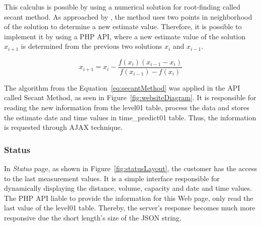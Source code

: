 This calculus is possible by using a numerical solution for root-finding called secant method. As approached by \cite{GIFLAT:2013}, the method uses two points in neighborhood of the solution to determine a new estimate value. Therefore, it is possible to implement it by using a \gls{PHP} \gls{API}, where a new estimate value of the solution \begin{math}x_{i+1}\end{math} is determined from the previous two solutions \begin{math}x_i\end{math} and \begin{math}x_{i-1}\end{math}.

\begin{equation}\label{eq:secantMethod}
    x_{i+1}=x_i - \frac{f(x_i)(x_{i-1}-x_i)}{f(x_{i-1})-f(x_i)}
\end{equation}

The algorithm from the Equation~\ref{eq:secantMethod} was applied in the \gls{API} called Secant Method, as seen in Figure~\ref{fig:websiteDiagram}. It is responsible for reading the new information from the level01 table, process the data and stores the estimate date and time values in time\_predict01 table. Thus, the information is requested through \gls{AJAX} technique.


\subsubsection{Status}

In \textit{Status} page, as shown in Figure~\ref{fig:statusLayout}, the customer has the access to the last measurement values. It is a simple interface responsible for dynamically displaying the distance, volume, capacity and date and time values. The \gls{PHP} \gls{API} liable to provide the information for this Web page, only read the last value of the level01 table. Thereby, the server's response becomes much more responsive due the short length's size of the \gls{JSON} string.

